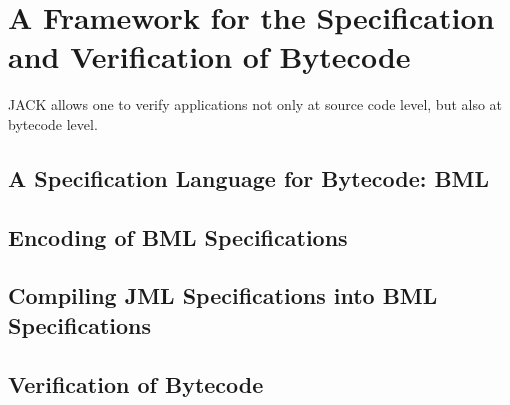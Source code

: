 \section{A Framework for the Specification and Verification of Bytecode}\label{SecBytecode}

JACK allows one to verify applications not only at source code level,
but also at bytecode level. 
\subsection{A Specification Language for Bytecode: BML}

\subsection{Encoding of BML Specifications}

\subsection{Compiling JML Specifications into BML Specifications}

\subsection{Verification of Bytecode}

